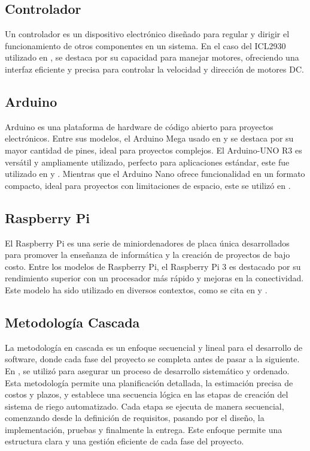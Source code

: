 \subsection{Controlador}
Un controlador es un dispositivo electrónico diseñado para regular y dirigir el funcionamiento de otros componentes en un sistema. En el caso del ICL2930 utilizado en \cite{hasan_implementation_2018}, se destaca por su capacidad para manejar motores, ofreciendo una interfaz eficiente y precisa para controlar la velocidad y dirección de motores DC.

\subsection*{Arduino}
Arduino es una plataforma de hardware de código abierto para proyectos electrónicos. Entre sus modelos, el Arduino Mega usado en \cite{lema_holguin_implementacion_2018} \cite{alcivar_dominguez_sistema_2018} y \cite{hasan_implementation_2018} se destaca por su mayor cantidad de pines, ideal para proyectos complejos. El Arduino-UNO R3 es versátil y ampliamente utilizado, perfecto para aplicaciones estándar, este fue utilizado en \cite{haiyan_intelligent_2022} y \cite{mohammed_intelligent_nodate} . Mientras que el Arduino Nano ofrece funcionalidad en un formato compacto, ideal para proyectos con limitaciones de espacio, este se utilizó en \cite{benyezza_zoning_2021}.

\subsection*{Raspberry Pi}
El Raspberry Pi es una serie de miniordenadores de placa única desarrollados para promover la enseñanza de informática y la creación de proyectos de bajo costo. Entre los modelos de Raspberry Pi, el Raspberry Pi 3 es destacado por su rendimiento superior con un procesador más rápido y mejoras en la conectividad. Este modelo ha sido utilizado en diversos contextos, como se cita en \cite{benyezza_zoning_2021} y \cite{jaramillo_diseno_2020}.

\subsection{Metodología Cascada}
La metodología en cascada es un enfoque secuencial y lineal para el desarrollo de software, donde cada fase del proyecto se completa antes de pasar a la siguiente. En \cite{alcivar_dominguez_sistema_2018}, se utilizó para asegurar un proceso de desarrollo sistemático y ordenado. Esta metodología permite una planificación detallada, la estimación precisa de costos y plazos, y establece una secuencia lógica en las etapas de creación del sistema de riego automatizado. Cada etapa se ejecuta de manera secuencial, comenzando desde la definición de requisitos, pasando por el diseño, la implementación, pruebas y finalmente la entrega. Este enfoque permite una estructura clara y una gestión eficiente de cada fase del proyecto.


